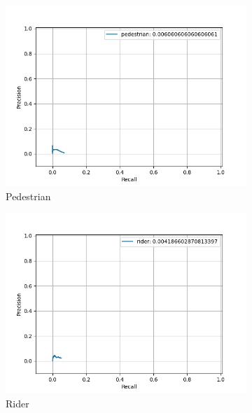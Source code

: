     \begin{figure}
    	\centering
    	\begin{subfigure}[t]{0.325\textwidth}
    		\centering
    		\includegraphics[width=\textwidth]{images/basic_pr/class_pedestrian_pr.jpg}
    		\caption{Pedestrian}
    	\end{subfigure}
    	\begin{subfigure}[t]{0.325\textwidth}
    		\centering
    		\includegraphics[width=\textwidth]{images/basic_pr/class_rider_pr.jpg}
    		\caption{Rider}
    	\end{subfigure}
    	\begin{subfigure}[t]{0.325\textwidth}
    		\centering

\end{subfigure}
\end{figure}
